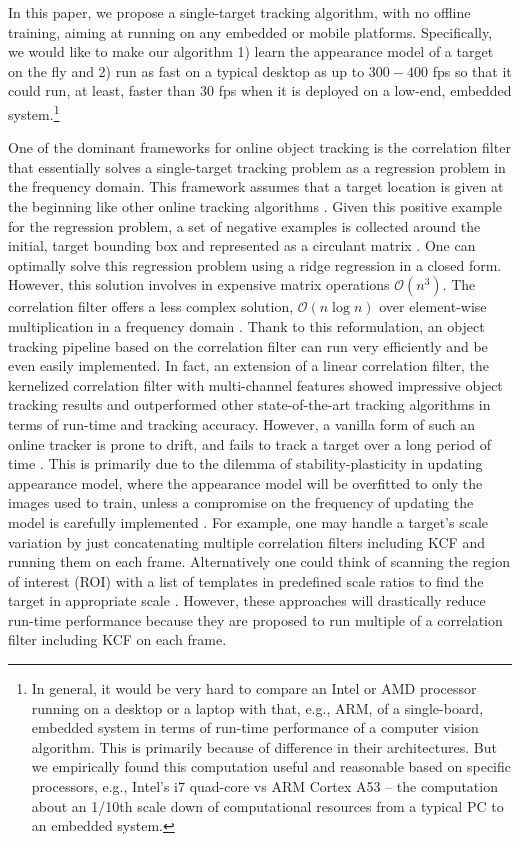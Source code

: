 \documentclass{bmvc2k}
\begin{document}
In this paper, we propose a single-target tracking algorithm, with no
offline training, aiming at running on any embedded or mobile
platforms. Specifically, we would like to make our algorithm 1) learn
the appearance model of a target on the fly and 2) run as fast on a
typical desktop as up to $300-400$ fps so that it could run, at least,
faster than 30 fps when it is deployed on a low-end, embedded
system.\footnote{In general, it would be very hard to compare an Intel
  or AMD processor running on a desktop or a laptop with that, e.g.,
  ARM, of a single-board, embedded system in terms of run-time
  performance of a computer vision algorithm. This is primarily
  because of difference in their architectures. But we empirically
  found this computation useful and reasonable based on specific
  processors, e.g., Intel's i7 quad-core vs ARM Cortex A53 -- the
  computation about an 1/10th scale down of computational resources
  from a typical PC to an embedded system.}

One of the dominant frameworks for online object tracking is the
correlation filter that essentially solves a single-target tracking
problem as a regression problem in the frequency domain. This
framework assumes that a target location is given at the beginning
like other online tracking algorithms
\cite{smeulders2014survey}. Given this positive example for the
regression problem, a set of negative examples is collected around the
initial, target bounding box and represented as a circulant matrix
\cite{henriques2015high}. One can optimally solve this regression
problem using a ridge regression in a closed form. However, this
solution involves in expensive matrix operations
$\mathcal{O}(n^{3})$. The correlation filter offers a less complex
solution, $\mathcal{O}(n\log n)$ over element-wise multiplication in a
frequency domain \cite{bolme2010visual,henriques2015high}. Thank to
this reformulation, an object tracking pipeline based on the
correlation filter can run very efficiently and be even easily
implemented. In fact, an extension of a linear correlation filter, the
kernelized correlation filter with multi-channel features
\cite{henriques2015high} showed impressive object tracking results and
outperformed other state-of-the-art tracking algorithms in terms of
run-time and tracking accuracy. However, a vanilla form of such an
online tracker is prone to drift, and fails to track a target over a
long period of time \cite{henriques2015high}. This is primarily due to
the dilemma of stability-plasticity in updating appearance model,
where the appearance model will be overfitted to only the images used
to train, unless a compromise on the frequency of updating the model
is carefully implemented \cite{santner2010prost}. For example, one may
handle a target's scale variation by just concatenating multiple
correlation filters including KCF and running them on each
frame. Alternatively one could think of scanning the region of
interest (ROI) with a list of templates in predefined scale ratios to
find the target in appropriate scale
\cite{henriques2015high,tang2015multi,ma2015long,bibi2015multi,li2014scale}. However,
these approaches will drastically reduce run-time performance because
they are proposed to run multiple of a correlation filter including
KCF on each frame.
\end{document}
